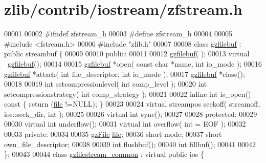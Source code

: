 \hypertarget{zlib_2contrib_2iostream_2zfstream_8h_source}{}\section{zlib/contrib/iostream/zfstream.h}
\label{zlib_2contrib_2iostream_2zfstream_8h_source}

\begin{DoxyCode}
00001 
00002 \textcolor{preprocessor}{#ifndef zfstream\_h}
00003 \textcolor{preprocessor}{#define zfstream\_h}
00004 
00005 \textcolor{preprocessor}{#include <fstream.h>}
00006 \textcolor{preprocessor}{#include "zlib.h"}
00007 
00008 \textcolor{keyword}{class }\hyperlink{classgzfilebuf}{gzfilebuf} : \textcolor{keyword}{public} streambuf \{
00009 
00010 \textcolor{keyword}{public}:
00011 
00012   \hyperlink{classgzfilebuf}{gzfilebuf}( );
00013   \textcolor{keyword}{virtual} ~\hyperlink{classgzfilebuf}{gzfilebuf}();
00014 
00015   \hyperlink{classgzfilebuf}{gzfilebuf} *open( \textcolor{keyword}{const} \textcolor{keywordtype}{char} *name, \textcolor{keywordtype}{int} io\_mode );
00016   \hyperlink{classgzfilebuf}{gzfilebuf} *attach( \textcolor{keywordtype}{int} file\_descriptor, \textcolor{keywordtype}{int} io\_mode );
00017   \hyperlink{classgzfilebuf}{gzfilebuf} *close();
00018 
00019   \textcolor{keywordtype}{int} setcompressionlevel( \textcolor{keywordtype}{int} comp\_level );
00020   \textcolor{keywordtype}{int} setcompressionstrategy( \textcolor{keywordtype}{int} comp\_strategy );
00021 
00022   \textcolor{keyword}{inline} \textcolor{keywordtype}{int} is\_open()\textcolor{keyword}{ const }\{ \textcolor{keywordflow}{return} (\hyperlink{structfile}{file} !=NULL); \}
00023 
00024   \textcolor{keyword}{virtual} streampos seekoff( streamoff, ios::seek\_dir, \textcolor{keywordtype}{int} );
00025 
00026   \textcolor{keyword}{virtual} \textcolor{keywordtype}{int} sync();
00027 
00028 \textcolor{keyword}{protected}:
00029 
00030   \textcolor{keyword}{virtual} \textcolor{keywordtype}{int} underflow();
00031   \textcolor{keyword}{virtual} \textcolor{keywordtype}{int} overflow( \textcolor{keywordtype}{int} = EOF );
00032 
00033 \textcolor{keyword}{private}:
00034 
00035   \hyperlink{structgz_file__s}{gzFile} \hyperlink{structfile}{file};
00036   \textcolor{keywordtype}{short} mode;
00037   \textcolor{keywordtype}{short} own\_file\_descriptor;
00038 
00039   \textcolor{keywordtype}{int} flushbuf();
00040   \textcolor{keywordtype}{int} fillbuf();
00041 
00042 \};
00043 
00044 \textcolor{keyword}{class }\hyperlink{classgzfilestream__common}{gzfilestream\_common} : \textcolor{keyword}{virtual} \textcolor{keyword}{public} ios \{

\end{DoxyCode}
